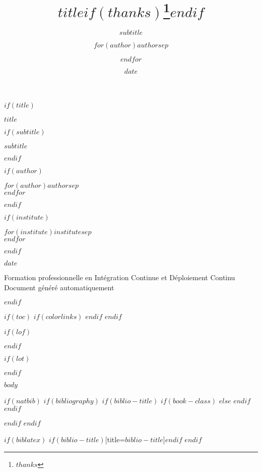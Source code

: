 \documentclass[$if(fontsize)$$fontsize$,$endif$$if(lang)$$babel-lang$,$endif$$if(papersize)$$papersize$paper,$endif$$for(classoption)$$classoption$$sep$,$endfor$]{$documentclass$}
\title{$title$$if(thanks)$\thanks{$thanks$}$endif$}
\subtitle{$subtitle$}
\author{$for(author)$$author$$sep$ \and $endfor$}
\institute{$for(institute)$$institute$$sep$ \and $endfor$}
\date{$date$}
\begin{document}
$if(title)$
\begin{titlepage}
\centering
\vspace*{2cm}

{\Huge\bfseries\color{primaryblue} $title$ \par}
\vspace{1cm}
$if(subtitle)$
{\Large\color{secondaryblue} $subtitle$ \par}
\vspace{1.5cm}
$endif$

$if(author)$
{\large\color{darkgray} $for(author)$$author$$sep$ \\ $endfor$ \par}
\vspace{1cm}
$endif$

$if(institute)$
{\normalsize\color{darkgray} $for(institute)$$institute$$sep$ \\ $endfor$ \par}
\vspace{1cm}
$endif$

{\normalsize\color{darkgray} $date$ \par}

\vfill


\vspace{2cm}

{\small\color{darkgray} 
Formation professionnelle en Intégration Continue et Déploiement Continu \\
Document généré automatiquement
}

\end{titlepage}
$endif$

$if(toc)$
{
$if(colorlinks)$
\hypersetup{linkcolor=$if(toccolor)$$toccolor$$else$black$endif$}
$endif$
\setcounter{tocdepth}{$toc-depth$}
\tableofcontents
\newpage
}
$endif$

$if(lof)$
\listoffigures
\newpage
$endif$

$if(lot)$
\listoftables
\newpage
$endif$

$body$

$if(natbib)$
$if(bibliography)$
$if(biblio-title)$
$if(book-class)$
\renewcommand\bibname{$biblio-title$}
$else$
\renewcommand\refname{$biblio-title$}
$endif$
$endif$

$endif$
$endif$

$if(biblatex)$
\printbibliography$if(biblio-title)$[title=$biblio-title$]$endif$
$endif$
\end{document}
